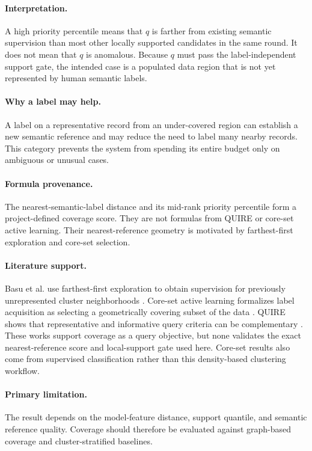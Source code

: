 \documentclass[11pt]{article}
\begin{document}
\paragraph{Interpretation.}
A high priority percentile means that $q$ is farther from existing semantic
supervision than most other locally supported candidates in the same round. It
does not mean that $q$ is anomalous. Because $q$ must pass the label-independent
support gate, the intended case is a populated data region that is not yet
represented by human semantic labels.

\paragraph{Why a label may help.}
A label on a representative record from an under-covered region can establish
a new semantic reference and may reduce the need to label many nearby records.
This category prevents the system from spending its entire budget only on
ambiguous or unusual cases.

\paragraph{Formula provenance.}
The nearest-semantic-label distance and its mid-rank priority percentile form a
project-defined coverage score. They are not formulas from QUIRE or core-set
active learning. Their nearest-reference geometry is motivated by farthest-first
exploration and core-set selection.

\paragraph{Literature support.}
Basu et al. use farthest-first exploration to obtain supervision for previously
unrepresented cluster neighborhoods \cite{basu2004active}. Core-set active
learning formalizes label acquisition as selecting a geometrically covering
subset of the data \cite{sener2018coreset}. QUIRE shows that representative and
informative query criteria can be complementary \cite{huang2014quire}. These
works support coverage as a query objective, but none validates the exact
nearest-reference score and local-support gate used here. Core-set results also
come from supervised classification rather than this density-based clustering
workflow.

\paragraph{Primary limitation.}
The result depends on the model-feature distance, support quantile, and semantic
reference quality. Coverage should therefore be evaluated against graph-based
coverage and cluster-stratified baselines.
\end{document}
